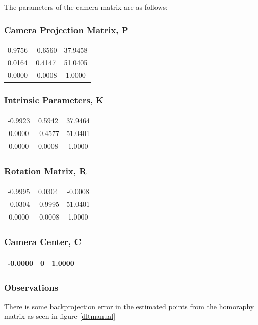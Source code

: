 \documentclass[12pt]{article}
\begin{document}
The parameters of the camera matrix are as follows:
\subsubsection{Camera Projection Matrix, P} 
\begin{tabular}{|c|c|c|}
\hline

  0.9756  &  -0.6560 &  37.9458 \\ 
  0.0164  &   0.4147 &  51.0405\\ 
  0.0000 &  -0.0008 &  1.0000
\\ 
\hline
\end{tabular}


\subsubsection{Intrinsic Parameters, K}
\begin{tabular}{|c|c|c|}
\hline

  -0.9923  &  0.5942 &  37.9464 \\ 
  0.0000  &   -0.4577 &  51.0401\\ 
  0.0000 &  0.0008 &  1.0000
\\ 
\hline
\end{tabular}



\subsubsection{Rotation Matrix, R}

\begin{tabular}{|c|c|c|}
\hline

  -0.9995 &  0.0304 &  -0.0008 \\ 
  -0.0304  &   -0.9995  &  51.0401\\ 
  0.0000 &  -0.0008 &  1.0000
\\ 
\hline
\end{tabular}

\subsubsection{Camera Center, C}
\begin{tabular}{|c|c|c|}
\hline

  -0.0000 & 0 & 1.0000 \\ 
\hline
\end{tabular}

\subsubsection{Observations}
There is some backprojection error in the estimated points from the homoraphy matrix as seen in figure \ref{dltmanual}
\end{document}
